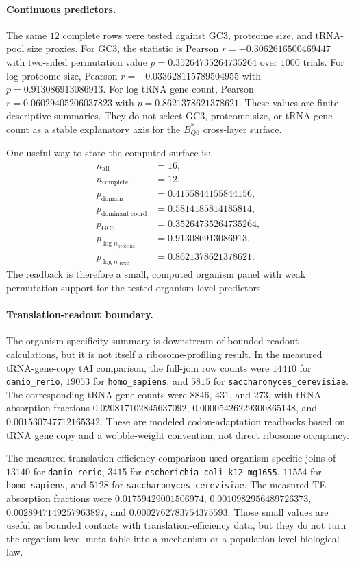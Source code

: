 \paragraph{Continuous predictors.}
The same $12$ complete rows were tested against GC3, proteome size, and tRNA-pool size proxies. For GC3, the statistic is Pearson $r=-0.3062616500469447$ with two-sided permutation value $p=0.35264735264735264$ over $1000$ trials. For log proteome size, Pearson $r=-0.033628115789504955$ with $p=0.913086913086913$. For log tRNA gene count, Pearson $r=0.06029405206037823$ with $p=0.8621378621378621$. These values are finite descriptive summaries. They do not select GC3, proteome size, or tRNA gene count as a stable explanatory axis for the $B^*_{Q6}$ cross-layer surface.

One useful way to state the computed surface is:
$$
\begin{aligned}
 n_{\mathrm{all}} &= 16,\\
 n_{\mathrm{complete}} &= 12,\\
 p_{\mathrm{domain}} &= 0.4155844155844156,\\
 p_{\mathrm{dominant\ coord}} &= 0.5814185814185814,\\
 p_{\mathrm{GC3}} &= 0.35264735264735264,\\
 p_{\log n_{\mathrm{proteins}}} &= 0.913086913086913,\\
 p_{\log n_{\mathrm{tRNA}}} &= 0.8621378621378621.
\end{aligned}
$$
The readback is therefore a small, computed organism panel with weak permutation support for the tested organism-level predictors.

\paragraph{Translation-readout boundary.}
The organism-specificity summary is downstream of bounded readout calculations, but it is not itself a ribosome-profiling result. In the measured tRNA-gene-copy tAI comparison, the full-join row counts were $14410$ for \texttt{danio\_rerio}, $19053$ for \texttt{homo\_sapiens}, and $5815$ for \texttt{saccharomyces\_cerevisiae}. The corresponding tRNA gene counts were $8846$, $431$, and $273$, with tRNA absorption fractions $0.020817102845637092$, $0.00005426229300865148$, and $0.001530747712165342$. These are modeled codon-adaptation readbacks based on tRNA gene copy and a wobble-weight convention, not direct ribosome occupancy.

The measured translation-efficiency comparison used organism-specific joins of $13140$ for \texttt{danio\_rerio}, $3415$ for \texttt{escherichia\_coli\_k12\_mg1655}, $11554$ for \texttt{homo\_sapiens}, and $5128$ for \texttt{saccharomyces\_cerevisiae}. The measured-TE absorption fractions were $0.01759429001506974$, $0.0010982956489726373$, $0.0028947149257963897$, and $0.0002762783754375593$. Those small values are useful as bounded contacts with translation-efficiency data, but they do not turn the organism-level meta table into a mechanism or a population-level biological law.

